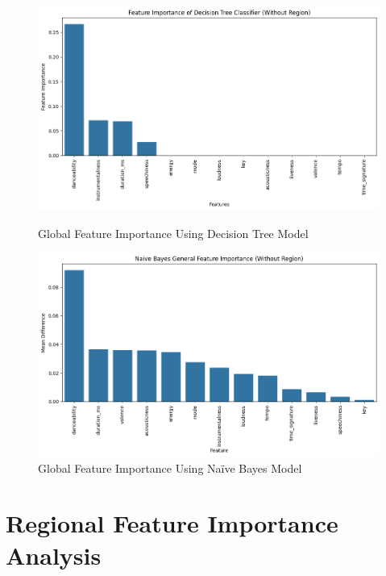 \begin{figure}[h]
    \centering
    \begin{minipage}{0.45\textwidth}
        \centering
        \includegraphics[width=\linewidth]{media/decision_tree_fea_imp_global.png}
        \caption{Global Feature Importance Using Decision Tree Model}
    \end{minipage}%
    \hspace{0.05\textwidth} %
    \begin{minipage}{0.45\textwidth}
        \centering
        \includegraphics[width=\linewidth]{media/naive_bayes_fea_imp_global.png}
        \caption{Global Feature Importance Using Naïve Bayes Model}
    \end{minipage}
\end{figure}

\newpage

\section{Regional Feature Importance Analysis}


